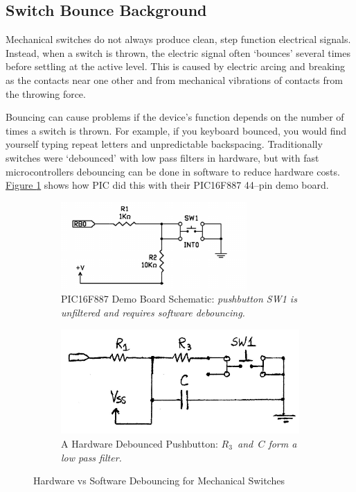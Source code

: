 \documentclass[11pt]{article}
\begin{document}
\subsection{Switch Bounce Background}

Mechanical switches do not always produce clean, step function electrical signals.
Instead, when a switch is thrown, the electric signal often `bounces' several times
before settling at the active level. This is caused by electric arcing and breaking
as the contacts near one other and from mechanical vibrations of contacts from the
throwing force.

Bouncing can cause problems if the device's function depends on the number of times
a switch is thrown. For example, if you keyboard bounced, you would find yourself
typing repeat letters and unpredictable backspacing. Traditionally switches were
`debounced' with low pass filters in hardware, but with fast microcontrollers
debouncing can be done in software to reduce hardware costs.
\hyperref[io-circuit-diagram]{Figure \ref{io-circuit-diagram}} shows how PIC did this
with their PIC16F887 44--pin demo board.

\begin{figure}[h!]
\centering
	\begin{subfigure}[b]{.4\textwidth}
		\centering
		\includegraphics[width=\textwidth]{Figures/demo-board-pushbutton-circuit.pdf}
		\caption[]%
		{{PIC16F887 Demo Board Schematic: \emph{pushbutton SW1 is unfiltered and requires software debouncing.}}}
	\end{subfigure}
	\quad
	\begin{subfigure}[b]{0.5\textwidth}
		\centering
		\includegraphics[width=\textwidth]{Figures/filtered-pushbutton-circuit.pdf}
		\caption[]%
		{{\small A Hardware Debounced Pushbutton: \emph{\mbox{$R_{3}$ and $C$} form a low pass filter.}}}
	\end{subfigure}	
	\caption{Hardware vs Software Debouncing for Mechanical Switches}
	\label{io-circuit-diagram}
\end{figure}
\end{document}
